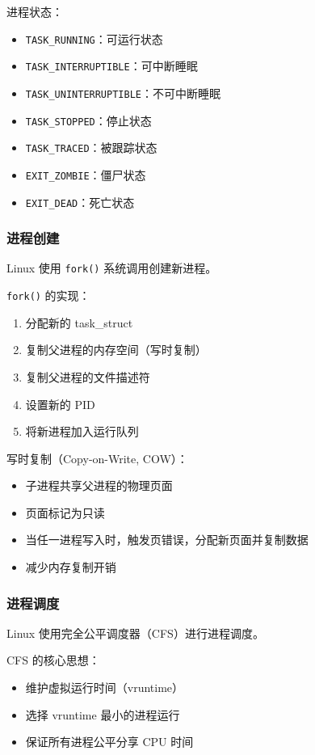 进程状态：
\begin{itemize}
  \item \texttt{TASK\_RUNNING}：可运行状态
  \item \texttt{TASK\_INTERRUPTIBLE}：可中断睡眠
  \item \texttt{TASK\_UNINTERRUPTIBLE}：不可中断睡眠
  \item \texttt{TASK\_STOPPED}：停止状态
  \item \texttt{TASK\_TRACED}：被跟踪状态
  \item \texttt{EXIT\_ZOMBIE}：僵尸状态
  \item \texttt{EXIT\_DEAD}：死亡状态
\end{itemize}

\subsubsection{进程创建}

Linux 使用 \texttt{fork()} 系统调用创建新进程。

\texttt{fork()} 的实现：
\begin{enumerate}
  \item 分配新的 task\_struct
  \item 复制父进程的内存空间（写时复制）
  \item 复制父进程的文件描述符
  \item 设置新的 PID
  \item 将新进程加入运行队列
\end{enumerate}

写时复制（Copy-on-Write, COW）：
\begin{itemize}
  \item 子进程共享父进程的物理页面
  \item 页面标记为只读
  \item 当任一进程写入时，触发页错误，分配新页面并复制数据
  \item 减少内存复制开销
\end{itemize}

\subsubsection{进程调度}

Linux 使用完全公平调度器（CFS）进行进程调度。

CFS 的核心思想：
\begin{itemize}
  \item 维护虚拟运行时间（vruntime）
  \item 选择 vruntime 最小的进程运行
  \item 保证所有进程公平分享 CPU 时间
\end{itemize}

